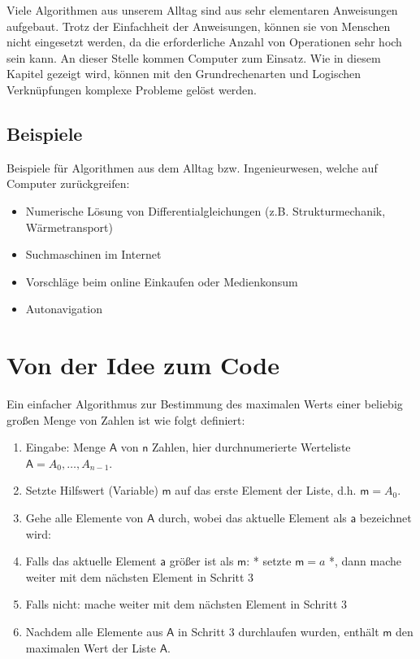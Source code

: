 \documentclass[
  letterpaper,
  DIV=11,
  numbers=noendperiod]{scrreprt}
\providecommand{\tightlist}{%
  \setlength{\itemsep}{0pt}\setlength{\parskip}{0pt}}\usepackage{longtable,booktabs,array}
\begin{document}
Viele Algorithmen aus unserem Alltag sind aus sehr elementaren
Anweisungen aufgebaut. Trotz der Einfachheit der Anweisungen, können sie
von Menschen nicht eingesetzt werden, da die erforderliche Anzahl von
Operationen sehr hoch sein kann. An dieser Stelle kommen Computer zum
Einsatz. Wie in diesem Kapitel gezeigt wird, können mit den
Grundrechenarten und Logischen Verknüpfungen komplexe Probleme gelöst
werden.

\section{Beispiele}\label{beispiele}

Beispiele für Algorithmen aus dem Alltag bzw. Ingenieurwesen, welche auf
Computer zurückgreifen:

\begin{itemize}
\tightlist
\item
  Numerische Lösung von Differentialgleichungen (z.B. Strukturmechanik,
  Wärmetransport)
\item
  Suchmaschinen im Internet
\item
  Vorschläge beim online Einkaufen oder Medienkonsum
\item
  Autonavigation
\end{itemize}

\chapter{Von der Idee zum Code}\label{von-der-idee-zum-code}

Ein einfacher Algorithmus zur Bestimmung des maximalen Werts einer
beliebig großen Menge von Zahlen ist wie folgt definiert:

\begin{enumerate}
\def\labelenumi{\arabic{enumi}.}
\tightlist
\item
  Eingabe: Menge \(\mathsf A\) von \(\mathsf n\) Zahlen, hier
  durchnumerierte Werteliste \(\mathsf A=A_0, \dots, A_{n-1}\).
\item
  Setzte Hilfswert (Variable) \(\mathsf m\) auf das erste Element der
  Liste, d.h. \(\mathsf m = A_0\).
\item
  Gehe alle Elemente von \(\mathsf A\) durch, wobei das aktuelle Element
  als \(\mathsf a\) bezeichnet wird:
\item
  Falls das aktuelle Element \(\mathsf a\) größer ist als \(\mathsf m\):
  * setzte \(\mathsf m = a\) *, dann mache weiter mit dem nächsten
  Element in Schritt 3
\item
  Falls nicht: mache weiter mit dem nächsten Element in Schritt 3
\item
  Nachdem alle Elemente aus \(\mathsf A\) in Schritt 3 durchlaufen
  wurden, enthält \(\mathsf m\) den maximalen Wert der Liste
  \(\mathsf A\).
\end{enumerate}
\end{document}
